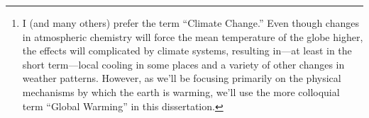 \documentclass[12pt]{myucthesis}
\begin{document}
\ssp %
\hypersetup{pageanchor=false}

\maketitle
\copyrightpage

\begin{abstract}

Global Warming\footnote{I (and many others) prefer the term “Climate Change.”
    Even though changes in atmospheric chemistry will force the mean temperature
    of the globe higher, the effects will complicated by climate systems,
    resulting in---at least in the short term---local cooling in some places and
    a variety of other changes in weather patterns. However, as we'll be
    focusing primarily on the physical mechanisms by which the earth is warming,
    we'll use the more colloquial term “Global Warming” in this dissertation.}
(“GW”) is easily one of the most pressing concerns of our time, and its solution
will come about only through a change in human behavior.  Compared to the
residents of most other nations worldwide, Americans report lower acceptance of
the realities of GW.  In order to address this concern in a free society, U.S.
residents must be convinced or coerced to take the necessary actions. In spite
of the democratic appeal of education, however, many climate communicators appear to
be settling on the notion that emotional persuasion is superior to education.


\end{abstract}
\end{document}
